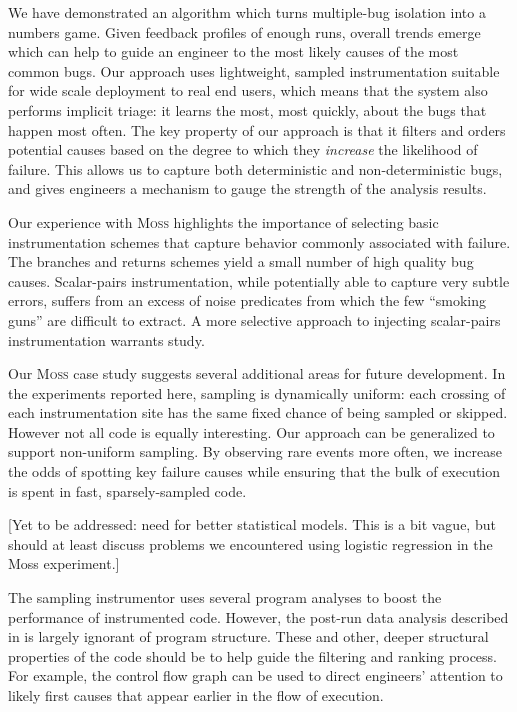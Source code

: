 \documentclass{sig-alternate}
\newcommand{\moss}{\textsc{Moss}\xspace}
\newcommand{\placeholder}[1]{{\color[cmyk]{0,0.61,0.87,0}[#1]}}
\begin{document}
We have demonstrated an algorithm which turns multiple-bug isolation
into a numbers game.  Given feedback profiles of enough runs, overall
trends emerge which can help to guide an engineer to the most likely
causes of the most common bugs.  Our approach uses lightweight,
sampled instrumentation suitable for wide scale deployment to real end
users, which means that the system also performs implicit triage: it
learns the most, most quickly, about the bugs that happen most often.
The key property of our approach is that it filters and orders
potential causes based on the degree to which they \emph{increase} the
likelihood of failure.  This allows us to capture both deterministic
and non-deterministic bugs, and gives engineers a mechanism to gauge
the strength of the analysis results.

Our experience with \moss highlights the importance of selecting basic
instrumentation schemes that capture behavior commonly associated with
failure.  The branches and returns schemes yield a small number of
high quality bug causes.  Scalar-pairs instrumentation, while
potentially able to capture very subtle errors, suffers from an excess
of noise predicates from which the few ``smoking guns'' are difficult
to extract.  A more selective approach to injecting scalar-pairs
instrumentation warrants study.

Our \moss case study suggests several additional areas for future
development.  In the experiments reported here, sampling is
dynamically uniform: each crossing of each instrumentation site has
the same fixed chance of being sampled or skipped.  However not all
code is equally interesting.  Our approach can be generalized to
support non-uniform sampling.  By observing rare events more often, we
increase the odds of spotting key failure causes while ensuring that
the bulk of execution is spent in fast, sparsely-sampled code.

\placeholder{Yet to be addressed: need for better statistical models.
  This is a bit vague, but should at least discuss problems we
  encountered using logistic regression in the Moss experiment.}

The sampling instrumentor uses several program analyses to boost the
performance of instrumented code.  However, the post-run data analysis
described in  is largely ignorant of program
structure.  These and other, deeper structural properties of the code
should be to help guide the filtering and ranking process.  For
example, the control flow graph can be used to direct engineers'
attention to likely first causes that appear earlier in the flow of
execution.


\end{document}
